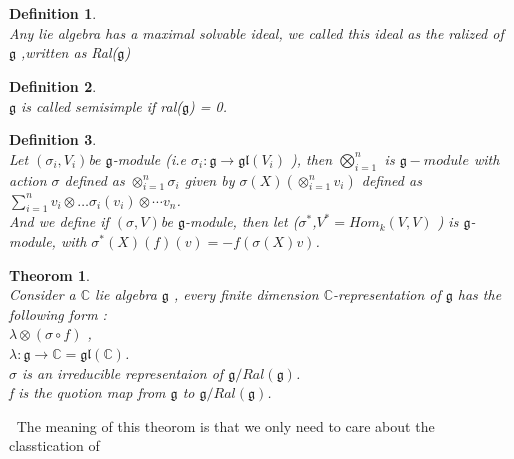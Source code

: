 \documentclass[UTF8]{ctexart}
\newtheorem{definition}{Definition}[section]
\newtheorem{theorom}{Theorom}[section]
\begin{document}
\section{}
 \begin{definition}
    $\ $ 
    \\Any lie algebra has a maximal solvable ideal, we called this ideal as the ralized of $\mathfrak{g}$ ,written as Ral($\mathfrak{g}$)

 \end{definition}
 \begin{definition}
    $\ $ 
    \\ $\mathfrak{g}$ is called semisimple if ral($\mathfrak{g}$) = {0}. 
    
 \end{definition}
 \begin{definition}
    $\ $ 
    \\ Let $(\sigma_i , V_i ) $be $\mathfrak{g}$-module (i.e $\sigma_i : \mathfrak{g} \rightarrow  \mathfrak{gl}(V_i)$ ),
    then $\bigotimes_{i=1}^n$ is $\mathfrak{g}-module$ with action $\sigma$ defined as  $\otimes_{i=1}^n \sigma_i$ given by 
    $ \sigma(X) (\otimes_{i=1}^n v_i )$ defined as $\sum_{i=1}^n v_i \otimes \dots \sigma_i(v_i) \otimes \cdots v_n $. 
    \\ And we define if $(\sigma , V ) $be $\mathfrak{g}$-module, then let ($\sigma^*$,$V^* = Hom_k(V, V)$ ) is $\mathfrak{g}$-module,
    with $\sigma^*(X)(f)(v) = -f(\sigma(X)v)$.
 \end{definition}
  \begin{theorom}
    $ \ $  \\Consider a $\mathbb{C}$ lie algebra $\mathfrak{g}$ , every finite dimension $\mathbb{C}$-representation of $\mathfrak{g}$ has the following form :
    \\$\lambda \otimes( \sigma  \circ f)$ , 
    \\ $\lambda: \mathfrak{g} \rightarrow \mathbb{C}=\mathfrak{gl}(\mathbb{C})$. 
    \\ $\sigma $ is an irreducible representaion of $\mathfrak{g}/Ral(\mathfrak{g})$.
    \\ f is the quotion map from $\mathfrak{g} $ to  $\mathfrak{g}/Ral(\mathfrak{g})$.

  \end{theorom}
$ \ $
The meaning of this theorom is that we only need to care about the classtication of 
\end{document}
